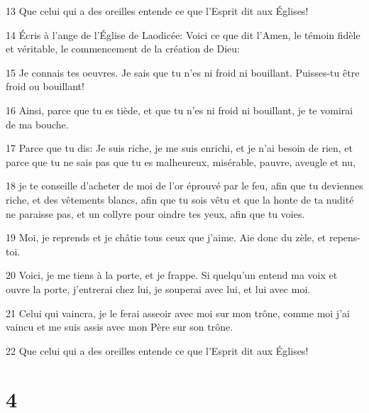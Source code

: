 \par 13 Que celui qui a des oreilles entende ce que l'Esprit dit aux Églises!
\par 14 Écris à l'ange de l'Église de Laodicée: Voici ce que dit l'Amen, le témoin fidèle et véritable, le commencement de la création de Dieu:
\par 15 Je connais tes oeuvres. Je sais que tu n'es ni froid ni bouillant. Puisses-tu être froid ou bouillant!
\par 16 Ainsi, parce que tu es tiède, et que tu n'es ni froid ni bouillant, je te vomirai de ma bouche.
\par 17 Parce que tu dis: Je suis riche, je me suis enrichi, et je n'ai besoin de rien, et parce que tu ne sais pas que tu es malheureux, misérable, pauvre, aveugle et nu,
\par 18 je te conseille d'acheter de moi de l'or éprouvé par le feu, afin que tu deviennes riche, et des vêtements blancs, afin que tu sois vêtu et que la honte de ta nudité ne paraisse pas, et un collyre pour oindre tes yeux, afin que tu voies.
\par 19 Moi, je reprends et je châtie tous ceux que j'aime. Aie donc du zèle, et repens-toi.
\par 20 Voici, je me tiens à la porte, et je frappe. Si quelqu'un entend ma voix et ouvre la porte, j'entrerai chez lui, je souperai avec lui, et lui avec moi.
\par 21 Celui qui vaincra, je le ferai asseoir avec moi sur mon trône, comme moi j'ai vaincu et me suis assis avec mon Père sur son trône.
\par 22 Que celui qui a des oreilles entende ce que l'Esprit dit aux Églises!

\chapter{4}

